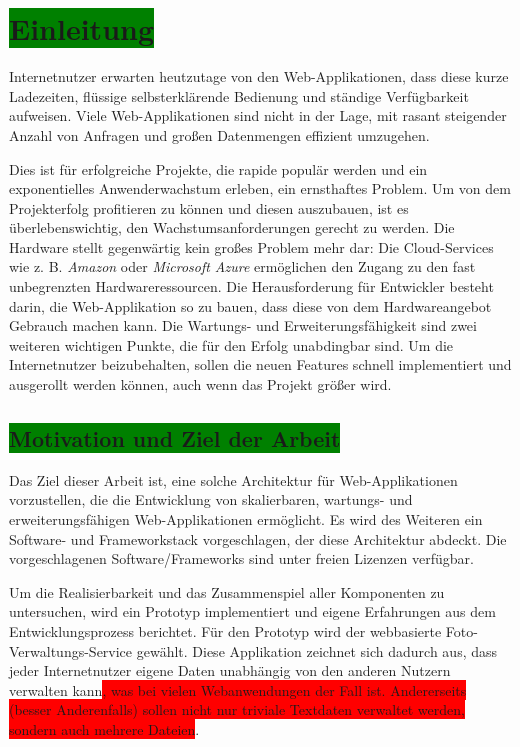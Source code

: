 \chapter{\colorbox{green}{Einleitung}}

Internetnutzer erwarten heutzutage von den Web-Applikationen, dass diese kurze Ladezeiten, flüssige selbsterklärende Bedienung und ständige Verfügbarkeit aufweisen. Viele Web-Applikationen sind nicht in der Lage, mit rasant steigender Anzahl von Anfragen und großen Datenmengen effizient umzugehen.

Dies ist für erfolgreiche Projekte, die rapide populär werden und ein exponentielles Anwenderwachstum erleben, ein ernsthaftes Problem. Um von dem Projekterfolg profitieren zu können und diesen auszubauen, ist es überlebenswichtig, den Wachstumsanforderungen gerecht zu werden. Die Hardware stellt gegenwärtig kein großes Problem mehr dar: Die Cloud-Services wie z. B. \textit{Amazon} oder \textit{Microsoft Azure} ermöglichen den Zugang zu den fast unbegrenzten Hardwareressourcen. Die Herausforderung für Entwickler besteht darin, die Web-Applikation so zu bauen, dass diese von dem Hardwareangebot Gebrauch machen kann. Die Wartungs- und Erweiterungsfähigkeit sind zwei weiteren wichtigen Punkte, die für den Erfolg unabdingbar sind. Um die Internetnutzer beizubehalten, sollen die neuen Features schnell implementiert und ausgerollt werden können, auch wenn das Projekt größer wird.

\section{\colorbox{green}{Motivation und Ziel der Arbeit}}

Das Ziel dieser Arbeit ist, eine solche Architektur für Web-Applikationen vorzustellen, die die Entwicklung von skalierbaren, wartungs- und erweiterungsfähigen Web-Applikationen ermöglicht. Es wird des Weiteren ein Software-  und Frameworkstack vorgeschlagen, der diese Architektur abdeckt. Die vorgeschlagenen Software/Frameworks sind unter freien Lizenzen verfügbar.

Um die Realisierbarkeit und das Zusammenspiel aller Komponenten zu untersuchen, wird ein Prototyp implementiert und eigene Erfahrungen aus dem Entwicklungsprozess berichtet. Für den Prototyp wird der webbasierte Foto-Verwaltungs-Service gewählt. Diese Applikation zeichnet sich dadurch aus, dass jeder Internetnutzer eigene Daten unabhängig von den anderen Nutzern verwalten kann\colorbox{red}{, was bei vielen Webanwendungen der Fall ist. Andererseits (besser Anderenfalls) sollen nicht nur triviale Textdaten verwaltet werden, sondern auch mehrere Dateien}.

